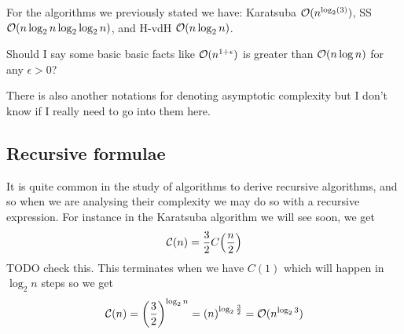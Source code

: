 For the algorithms we previously stated we have: Karatsuba $\mathcal O(n^{\log_2(3)})$, SS $\mathcal O(n\log_2 n \log_2 \log_2 n)$, and H-vdH $\mathcal O(n \log_2 n)$.

Should I say some basic basic facts like $\mathcal O(n^{1 + \epsilon})$ is greater than $\mathcal O(n\log n)$ for any $\epsilon > 0$?

There is also another notations for denoting asymptotic complexity but I don't know if I really need to go into them here.

\subsection{Recursive formulae}%
\label{sub:Recursive forumulae}

It is quite common in the study of algorithms to derive recursive algorithms, and so when we are analysing their complexity we may do so with a recursive expression. For instance in the Karatsuba algorithm we will see soon, we get
\[
    \M{C}(n) = \frac{3}{2}C\bb{\frac{n}{2}}
\]
TODO check this.
This terminates when we have $C(1)$ which will happen in $\log_2 n$ steps so we get
\[
    \M{C}(n) = \bb{\frac{3}{2}}^{\log_2 n} = \bb{n}^{\log_2 \frac{3}{2}} = \M{O}(n^{\log_2 3})
\]
